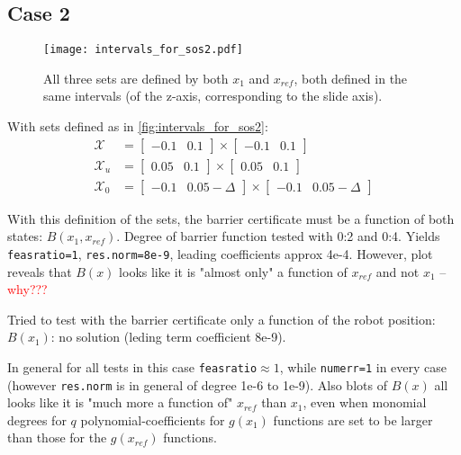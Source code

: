 \newpage
\subsection{Case 2}\label{case2}
\begin{figure}[htbp]
\centering\texttt{[image: intervals\_for\_sos2.pdf]}
\caption{All three sets are defined by both $x_1$ and $x_{ref}$, both defined in the same intervals (of the z-axis, corresponding to the slide axis).}
\label{fig:intervals_for_sos2}
\end{figure}

With sets defined as in \autoref{fig:intervals_for_sos2}:
\begin{align}
	\mathcal{X} &= \begin{bmatrix} -0.1 & 0.1\end{bmatrix} \times \begin{bmatrix} -0.1 & 0.1\end{bmatrix}\\
	\mathcal{X}_u &= \begin{bmatrix} 0.05 & 0.1\end{bmatrix} \times \begin{bmatrix} 0.05 & 0.1\end{bmatrix}\\
	\mathcal{X}_0 &= \begin{bmatrix} -0.1 & 0.05-\Delta\end{bmatrix} \times \begin{bmatrix} -0.1 & 0.05-\Delta\end{bmatrix}
\end{align}

With this definition of the sets, the barrier certificate must be a function of both states: $B(x_1,x_{ref})$. Degree of barrier function tested with 0:2 and 0:4. Yields \texttt{feasratio=1}, \texttt{res.norm=8e-9}, leading coefficients approx 4e-4. However, plot reveals that $B(x)$ looks like it is "almost only" a function of $x_{ref}$ and not $x_1$ -- \textcolor{red}{why???}

Tried to test with the barrier certificate only a function of the robot position: $B(x_1)$: no solution (leding term coefficient 8e-9).

In general for all tests in this case \texttt{feasratio}$\approx 1$, while \texttt{numerr=1} in every case (however \texttt{res.norm} is in general of degree 1e-6 to 1e-9). Also blots of $B(x)$ all looks like it is "much more a function of" $x_{ref}$ than $x_1$, even when monomial degrees for $q$ polynomial-coefficients for $g(x_1)$ functions are set to be larger than those for the $g(x_{ref})$ functions.

